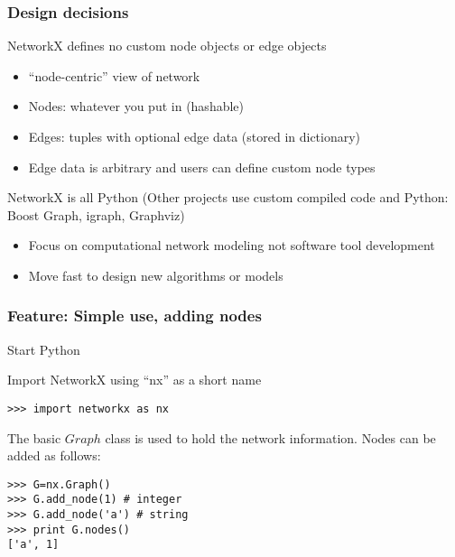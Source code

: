 \documentclass[xcolor=dvipsnames, 9pt]{beamer}
\begin{document}
\begin{frame}[fragile]
\frametitle{Design decisions}

\begin{block}
{NetworkX defines no custom node objects or edge objects}

\begin{itemize}
\item ``node-centric'' view of network

\item Nodes: whatever you put in (hashable)

\item Edges: tuples with optional edge data (stored in dictionary)

\item Edge data is arbitrary and users can define custom node types

\end{itemize}
\end{block}




\begin{block}
{NetworkX is all Python}
(Other projects use custom compiled code and Python: Boost Graph,
  igraph, Graphviz)

\begin{itemize}
\item Focus on computational network modeling not software tool development

\item Move fast to design new algorithms or models 


\end{itemize}
\end{block}


\end{frame}



\begin{frame}[fragile]
\frametitle{Feature: Simple use, adding nodes}

Start Python

Import NetworkX using ``nx'' as a short name
\begin{block}{}
\begin{verbatim}
>>> import networkx as nx 
\end{verbatim}
\end{block}
The basic $Graph$ class is used to hold the network information.
Nodes can be added as follows:
\begin{block}{}
\begin{verbatim}
>>> G=nx.Graph()
>>> G.add_node(1) # integer
>>> G.add_node('a') # string
>>> print G.nodes()
['a', 1]
\end{verbatim}
\end{block}

\end{frame}
\end{document}
